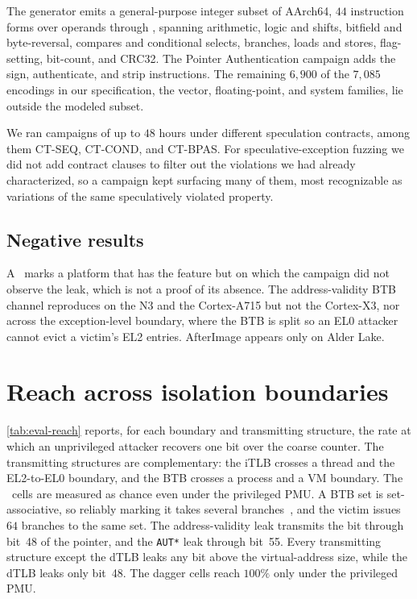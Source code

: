 The generator emits a general-purpose integer subset of AArch64, $44$ instruction forms over
operands  through , spanning arithmetic, logic and shifts, bitfield and byte-reversal,
compares and conditional selects, branches, loads and stores, flag-setting, bit-count, and CRC32. The
Pointer Authentication campaign adds the sign, authenticate, and strip instructions. The remaining
$6{,}900$ of the $7{,}085$ encodings in our specification, the vector, floating-point, and system
families, lie outside the modeled subset.

We ran campaigns of up to $48$ hours under different speculation contracts, among them
\textsc{CT-SEQ}, \textsc{CT-COND}, and \textsc{CT-BPAS}. For speculative-exception fuzzing we did
not add contract clauses to filter out the violations we had already characterized, so a campaign
kept surfacing many of them, most recognizable as variations of the same speculatively violated
property.

\subsection{Negative results}
\label{sec:eval-negatives}
A \xmark\ marks a platform that has the feature but on which the campaign did not observe the leak,
which is not a proof of its absence. The address-validity BTB channel reproduces on the N3 and the
Cortex-A715 but not the Cortex-X3, nor across the exception-level boundary, where the BTB is split so
an EL0 attacker cannot evict a victim's EL2 entries. AfterImage appears only on Alder Lake.

\section{Reach across isolation boundaries}
\label{sec:eval-reach}

\autoref{tab:eval-reach} reports, for each boundary and transmitting structure, the rate at which an
unprivileged attacker recovers one bit over the coarse  counter. The transmitting
structures are complementary: the iTLB crosses a thread and the EL2-to-EL0 boundary, and the BTB
crosses a process and a VM boundary. The \xmark\ cells are measured as chance even under the
privileged PMU. A BTB set is set-associative, so reliably marking it takes several
branches~\cite{indirector}, and the victim issues $64$ branches to the same set. The
address-validity leak transmits the bit through bit~48 of the pointer, and the \texttt{AUT*} leak
through bit~55. Every transmitting structure except the dTLB leaks any bit above the
virtual-address size, while the dTLB leaks only bit~48. The dagger cells reach $100\%$ only under
the privileged PMU.


